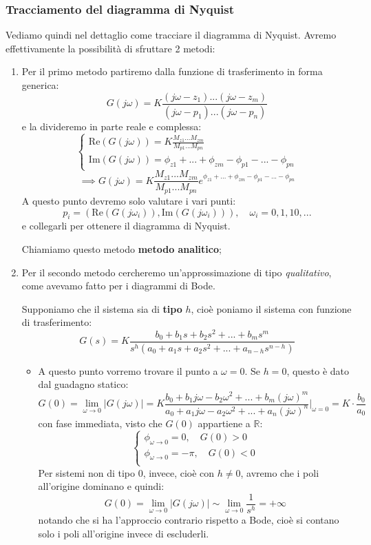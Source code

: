 \documentclass[a4paper,11pt]{article}
\begin{document}
\subsubsection{Tracciamento del diagramma di Nyquist}
Vediamo quindi nel dettaglio come tracciare il diagramma di Nyquist.
Avremo effettivamente la possibilità di sfruttare 2 metodi:
\begin{enumerate}
	\item 
		Per il primo metodo partiremo dalla funzione di trasferimento in forma generica:
		$$
		G(j \omega) = K \frac{ (j\omega - z_1) ... (j\omega - z_m) }{ (j\omega - p_1) ... (j\omega - p_n) }
		$$
		e la divideremo in parte reale e complessa:
		\[
			\begin{cases}
				\mathrm{Re}\left( G(j\omega) \right) = K \frac{M_{z1} ... M_{zm}}{M_{p1} ... M_{pn}} \\
				\mathrm{Im} \left( G(j\omega) \right) = \phi_{z1} + ... + \phi_{zm} - \phi_{p1} - ... - \phi_{pn}
			\end{cases}
		\]
		\[
			\implies
			G(j\omega) = K \frac{M_{z1} ... M_{zm}}{M_{p1} ... M_{pn}} e^{\phi_{z1} + ... + \phi_{zm} - \phi_{p1} - ... - \phi_{pn}}
		\]
		A questo punto devremo solo valutare i vari punti:
		$$
		p_i = \left( \mathrm{Re}\left( G(j\omega_i) \right), \mathrm{Im}\left( G(j\omega_i) \right) \right), \quad \omega_i = 0, 1, 10, ...
		$$
		e collegarli per ottenere il diagramma di Nyquist.

		Chiamiamo questo metodo \textbf{metodo analitico};

	\item
		Per il secondo metodo cercheremo un'approssimazione di tipo \textit{qualitativo}, come avevamo fatto per i diagrammi di Bode.

		Supponiamo che il sistema sia di \textbf{tipo} $h$, cioè poniamo il sistema con funzione di trasferimento:
		$$
		G(s) = K \frac{ b_0 + b_1 s + b_2 s^2 + ... + b_m s^m }{ s^h ( a_0 + a_1 s + a_2 s^2 + ... + a_{n - h} s^{n - h} ) }
		$$

		\begin{itemize}
			\item 
				A questo punto vorremo trovare il punto a $\omega = 0$.
				Se $h = 0$, questo è dato dal guadagno statico:
				$$
				G(0) = \lim_{\omega \rightarrow 0} |G(j \omega)| = K \frac{ b_0 + b_1 j \omega - b_2 \omega^2 + ... + b_m (j\omega)^m }{  a_0 + a_1 j \omega - a_2 \omega^2 + ... + a_n (j \omega)^n  } \Bigg|_{\omega = 0} = K \cdot \frac{b_0}{a_0}
				$$
				con fase immediata, visto che $G(0)$ appartiene a $\mathbb{R}$:
				\[
					\begin{cases}
						\phi_{\omega \rightarrow 0} = 0, \quad G(0) > 0 \\	
						\phi_{\omega \rightarrow 0} = -\pi, \quad G(0) < 0 \\	
					\end{cases}
				\]
				Per sistemi non di tipo $0$, invece, cioè con $h \neq 0$, avremo che i poli all'origine dominano e quindi:
				$$
				G(0) = \lim_{\omega \rightarrow 0} |G(j\omega)| \sim \lim_{\omega \rightarrow 0} \frac{1}{s^h} = +\infty
				$$
				notando che si ha l'approccio contrario rispetto a Bode, cioè si contano solo i poli all'origine invece di escluderli.


\end{itemize}
\end{enumerate}
\end{document}
